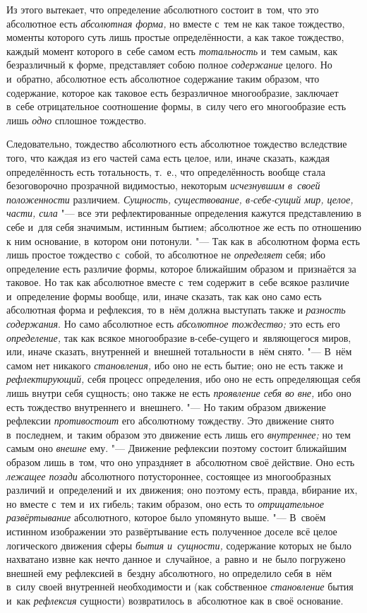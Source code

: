 Из этого вытекает, что определение абсолютного состоит в~том, что это
абсолютное есть {\em абсолютная форма,} но вместе с~тем
не как такое тождество, моменты которого суть лишь простые определённости,
а как такое тождество, каждый момент которого в~себе самом есть
{\em тотальность} и~тем самым, как безразличный к
форме, представляет собою полное {\em содержание}
целого. Но и~обратно, абсолютное есть абсолютное содержание таким образом,
что содержание, которое как таковое есть безразличное многообразие,
заключает в~себе отрицательное соотношение формы, в~силу чего его
многообразие есть лишь {\em одно} сплошное тождество.

Следовательно, тождество абсолютного есть абсолютное тождество вследствие
того, что каждая из его частей сама есть целое, или, иначе сказать, каждая
определённость есть тотальность, т.~е., что определённость вообще стала
безоговорочно прозрачной видимостью, некоторым
{\em исчезнувшим в~своей положенности} различием.
{\em Сущность, существование, в-себе-сущий мир, целое,
части, сила} "--- все эти рефлектированные определения кажутся представлению в
себе и~для себя значимым, истинным бытием; абсолютное же есть по отношению
к ним основание, в~котором они потонули. "--- Так как в~абсолютном форма есть
лишь простое тождество с~собой, то абсолютное не
{\em определяет} себя; ибо определение есть различие
формы, которое ближайшим образом и~признаётся за таковое. Но так как
абсолютное вместе с~тем содержит в~себе всякое различие и~определение формы
вообще, или, иначе сказать, так как оно само есть абсолютная форма и
рефлексия, то в~нём должна выступать также и
{\em разность содержания}. Но само абсолютное есть
{\em абсолютное тождество;} это есть его
{\em определение,} так как всякое многообразие
в-себе-сущего и~являющегося миров, или, иначе сказать, внутренней и~внешней
тотальности в~нём снято. "--- В~нём самом нет никакого
{\em становления,} ибо оно не есть бытие; оно не есть
также и {\em рефлектирующий,} себя процесс определения,
ибо оно не есть определяющая себя лишь внутри себя сущность; оно также не
есть {\em проявление себя во вне,} ибо оно есть
тождество внутреннего и~внешнего. "--- Но таким образом движение рефлексии
{\em противостоит} его абсолютному тождеству. Это
движение снято в~последнем, и~таким образом это движение есть лишь его
{\em внутреннее;} но тем самым оно
{\em внешне} ему. "--- Движение рефлексии поэтому состоит
ближайшим образом лишь в~том, что оно упраздняет в~абсолютном своё
действие. Оно есть {\em лежащее позади} абсолютного
потустороннее, состоящее из многообразных различий и~определений и~их
движения; оно поэтому есть, правда, вбирание их, но вместе с~тем и~их
гибель; таким образом, оно есть то {\em отрицательное
развёртывание} абсолютного, которое было упомянуто выше. "--- В~своём истинном
изображении это развёртывание есть полученное доселе всё целое логического
движения сферы {\em бытия и~сущности,} содержание
которых не было нахватано извне как нечто данное и~случайное, а~равно и~не
было погружено внешней ему рефлексией в~бездну абсолютного, но определило
себя в~нём в~силу своей внутренней необходимости и (как собственное
{\em становление} бытия и~как
{\em рефлексия} сущности) возвратилось в~абсолютное как
в своё основание.

